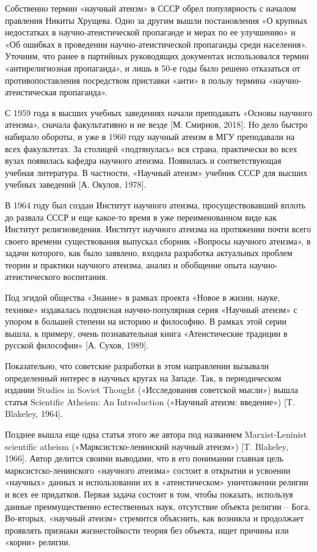Собственно термин «научный атеизм» в СССР обрел популярность с началом правления Никиты Хрущева. Одно за другим вышли постановления «О крупных недостатках в научно-атеистической пропаганде и мерах по ее улучшению» и «Об ошибках в проведении научно-атеистической пропаганды среди населения». Уточним, что ранее в партийных руководящих документах использовался термин «антирелигиозная пропаганда», и лишь в 50-е годы было решено отказаться от противопоставления посредством приставки «анти» в пользу термина «научно-атеистическая пропаганда».

С 1959 года в высших учебных заведениях начали преподавать «Основы научного атеизма», сначала факультативно и не везде [М. Смирнов, 2018]. Но дело быстро набирало обороты, и уже в 1960 году научный атеизм в МГУ преподавали на всех факультетах. За столицей «подтянулась» вся страна, практически во всех вузах появилась кафедра научного атеизма. Появилась и соответствующая учебная литература. В частности, «Научный атеизм» учебник СССР для высших учебных заведений [А. Окулов, 1978].

В 1964 году был создан Институт научного атеизма, просуществовавший вплоть до развала СССР и еще какое-то время в уже переименованном виде как Институт религиоведения. Институт научного атеизма на протяжении почти всего своего времени существования выпускал сборник «Вопросы научного атеизма», в задачи которого, как было заявлено, входила разработка актуальных проблем теории и практики научного атеизма, анализ и обобщение опыта научно-атеистического воспитания.

Под эгидой общества «Знание» в рамках проекта «Новое в жизни, науке, технике» издавалась подписная научно-популярная серия «Научный атеизм» с упором в большей степени на историю и философию. В рамках этой серии вышла, к примеру, очень познавательная книга «Атеистические традиции в русской философии» [А. Сухов, 1989].

Показательно, что советские разработки в этом направлении вызывали определенный интерес в научных кругах на Западе. Так, в периодическом издании Studies in Soviet Thought («Исследования советской мысли») вышла статья Scientific Atheism: An Introduction («Научный атеизм: введение») [T. Blakeley, 1964].

Позднее вышла еще одна статья этого же автора под названием Marxist‐Leninist scientific atheism («Марксистско-ленинский научный атеизм») [T. Blakeley, 1966]. Автор делится своими выводами, что в его понимании главная цель марксистско-ленинского «научного атеизма» состоит в открытии и усвоении «научных» данных и использовании их в «атеистическом» уничтожении религии и всех ее придатков. Первая задача состоит в том, чтобы показать, используя данные преимущественно естественных наук, отсутствие объекта религии – Бога. Во-вторых, «научный атеизм» стремится объяснить, как возникла и продолжает проявлять признаки жизнестойкости теория без объекта, ищет причины или «корни» религии.

